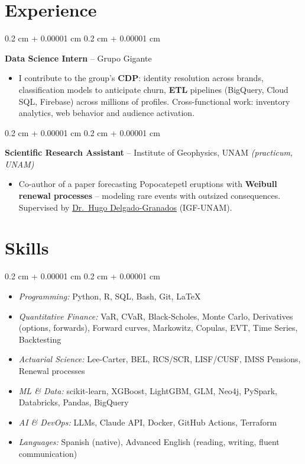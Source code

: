 \documentclass[10pt, letterpaper]{article}
\newenvironment{highlights}{
    \begin{itemize}[
        topsep=0.05 cm,
        parsep=0.05 cm,
        partopsep=0pt,
        itemsep=0pt,
        leftmargin=0.4 cm + 10pt
    ]
}{
    \end{itemize}
}
\newenvironment{highlightsforbulletentries}{
    \begin{itemize}[
        topsep=0.02 cm,
        parsep=0.05 cm,
        partopsep=0pt,
        itemsep=0pt,
        leftmargin=10pt
    ]
}{
    \end{itemize}
}
\newenvironment{onecolentry}{
    \begin{adjustwidth}{
        0.2 cm + 0.00001 cm
    }{
        0.2 cm + 0.00001 cm
    }
}{
    \end{adjustwidth}
}
\let\hrefWithoutArrow\href
\renewcommand{\href}[2]{\hrefWithoutArrow{#1}{\ifthenelse{\equal{#2}{}}{ }{#2 }\raisebox{.15ex}{\footnotesize \faExternalLink*}}}
\begin{document}
    \section{Experience}

        \begin{onecolentry}
            \textbf{Data Science Intern} -- Grupo Gigante
            \begin{highlights}
                \item I contribute to the group's \textbf{CDP}: identity resolution across brands, classification models to anticipate churn, \textbf{ETL} pipelines (BigQuery, Cloud SQL, Firebase) across millions of profiles. Cross-functional work: inventory analytics, web behavior and audience activation.
            \end{highlights}
            \end{onecolentry}

        \vspace{0.02 cm}

        \begin{onecolentry}
            \textbf{Scientific Research Assistant} -- Institute of Geophysics, UNAM \textit{(practicum, UNAM)}
            \begin{highlights}
                \item Co-author of a paper forecasting Popocatepetl eruptions with \textbf{Weibull renewal processes} -- modeling rare events with outsized consequences. Supervised by \hrefWithoutArrow{https://scholar.google.com/citations?user=lDD0DZQAAAAJ}{Dr.\ Hugo Delgado-Granados} (IGF-UNAM).
            \end{highlights}
            \end{onecolentry}


    \section{Skills}

\begin{onecolentry}
    \begin{highlightsforbulletentries}
        \item \textit{Programming:} Python, R, SQL, Bash, Git, \LaTeX
        \item \textit{Quantitative Finance:} VaR, CVaR, Black-Scholes, Monte Carlo, Derivatives (options, forwards), Forward curves, Markowitz, Copulas, EVT, Time Series, Backtesting
        \item \textit{Actuarial Science:} Lee-Carter, BEL, RCS/SCR, LISF/CUSF, IMSS Pensions, Renewal processes
        \item \textit{ML \& Data:} scikit-learn, XGBoost, LightGBM, GLM, Neo4j, PySpark, Databricks, Pandas, BigQuery
        \item \textit{AI \& DevOps:} LLMs, Claude API, Docker, GitHub Actions, Terraform
        \item \textit{Languages:} Spanish (native), Advanced English (reading, writing, fluent communication)
    \end{highlightsforbulletentries}
\end{onecolentry}
\end{document}
